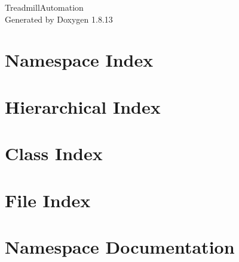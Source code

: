 \documentclass[twoside]{book}
\newcommand{\+}{\discretionary{\mbox{\scriptsize$\hookleftarrow$}}{}{}}
\newcommand{\clearemptydoublepage}{%
  \newpage{\pagestyle{empty}\cleardoublepage}%
}
\begin{document}
\hypersetup{pageanchor=false,
             bookmarksnumbered=true,
             pdfencoding=unicode
            }
\begin{titlepage}
\vspace*{7cm}
\begin{center}%
{\Large Treadmill\+Automation }\\
\vspace*{1cm}
{\large Generated by Doxygen 1.8.13}\\
\end{center}
\end{titlepage}
\clearemptydoublepage
{}
\tableofcontents
\clearemptydoublepage
{}
\hypersetup{pageanchor=true}

\chapter{Namespace Index}

\chapter{Hierarchical Index}

\chapter{Class Index}

\chapter{File Index}

\chapter{Namespace Documentation}


\end{document}
